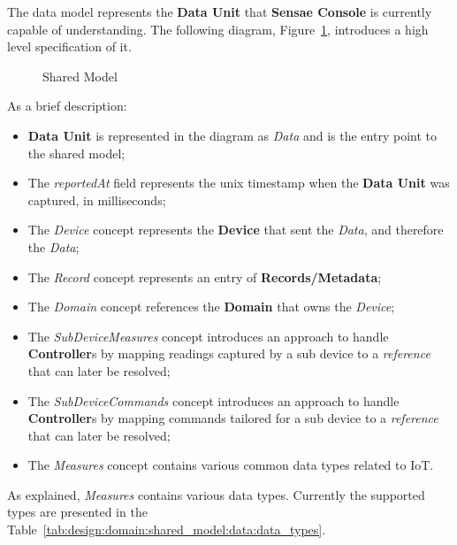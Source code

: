 The data model represents the \textbf{Data Unit} that \textbf{Sensae Console} is currently capable of understanding. The following diagram, Figure~\ref{fig:design:domain:shared_model:data:diagram}, introduces a high level specification of it.

\begin{figure}[H]
   \centering
  \resizebox{\columnwidth}{!}
  {
     
  }
  \caption[Shared Model]{Shared Model}
  \label{fig:design:domain:shared_model:data:diagram}
\end{figure}

As a brief description:

\begin{itemize}
   \item \textbf{Data Unit} is represented in the diagram as \textit{Data} and is the entry point to the shared model;
   \item The \textit{reportedAt} field represents the unix timestamp when the \textbf{Data Unit} was captured, in milliseconds;
   \item The \textit{Device} concept represents the \textbf{Device} that sent the \textit{Data}, and therefore the \textit{Data};
   \item The \textit{Record} concept represents an entry of \textbf{Records/Metadata};
   \item The \textit{Domain} concept references the \textbf{Domain} that owns the \textit{Device};
   \item The \textit{SubDeviceMeasures} concept introduces an approach to handle \textbf{Controller}s by mapping readings captured by a sub device to a \textit{reference} that can later be resolved;
   \item The \textit{SubDeviceCommands} concept introduces an approach to handle \textbf{Controller}s by mapping commands tailored for a sub device to a \textit{reference} that can later be resolved;
   \item The \textit{Measures} concept contains various common data types related to \gls{IoT}.
\end{itemize}

As explained, \textit{Measures} contains various data types. Currently the supported types are presented in the Table~\ref{tab:design:domain:shared_model:data:data_types}.

